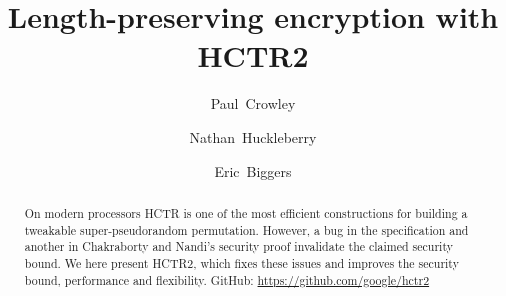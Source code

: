 \documentclass[letterpaper,11pt]{article}
\author{Paul~Crowley}
\author{Nathan~Huckleberry}
\author{Eric~Biggers}
\affil{Google}
\title{Length-preserving encryption with HCTR2}
\begin{document}
\maketitle

\begin{abstract}
On modern processors HCTR\cite{hctr} is
one of the most efficient constructions
for building a tweakable super-pseudorandom permutation. However,
a bug in the specification and another in
Chakraborty and Nandi's security proof\cite{hctrquad}
invalidate the claimed security bound. We here present HCTR2,
which fixes these issues and improves the
security bound, performance and flexibility.
GitHub: \url{https://github.com/google/hctr2}
\end{abstract}








\printbibliography[heading=bibintoc]
\appendix

%
\end{document}
